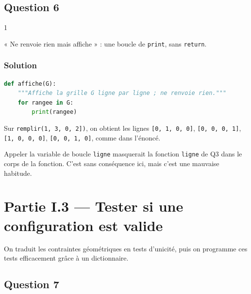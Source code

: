 \documentclass[11pt,a4paper]{article}
\begin{document}
\hypertarget{question-6}{%
\subsection{Question 6}\label{question-6}}

\begin{indication}{1}

« Ne renvoie rien mais affiche » : une boucle de \texttt{print}, sans \texttt{return}.

\end{indication}

\hypertarget{solution-5}{%
\subsubsection{Solution}\label{solution-5}}

\begin{lstlisting}[language=Python]
def affiche(G):
    """Affiche la grille G ligne par ligne ; ne renvoie rien."""
    for rangee in G:
        print(rangee)
\end{lstlisting}

Sur \texttt{remplir(\allowbreak{}{[}1,\allowbreak{}\ 3,\allowbreak{}\ 0,\allowbreak{}\ 2{]}\allowbreak{})\allowbreak{}}, on obtient les lignes \texttt{{[}0,\ 1,\ 0,\ 0{]}}, \texttt{{[}0,\ 0,\ 0,\ 1{]}}, \texttt{{[}1,\ 0,\ 0,\ 0{]}}, \texttt{{[}0,\ 0,\ 1,\ 0{]}}, comme dans l'énoncé.

\begin{piege}

Appeler la variable de boucle \texttt{ligne} masquerait la fonction \texttt{ligne} de Q3 dans le corps de la fonction. C'est sans conséquence ici, mais c'est une mauvaise habitude.

\end{piege}

\hypertarget{partie-i.3-tester-si-une-configuration-est-valide}{%
\section{Partie I.3 --- Tester si une configuration est valide}\label{partie-i.3-tester-si-une-configuration-est-valide}}

On traduit les contraintes géométriques en tests d'unicité, puis on programme ces tests efficacement grâce à un dictionnaire.

\hypertarget{question-7}{%
\subsection{Question 7}\label{question-7}}
\end{document}

